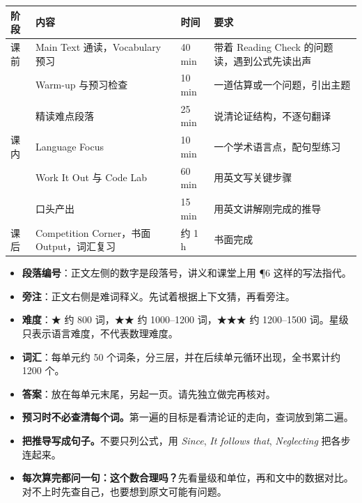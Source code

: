 \documentclass[11pt,a4paper]{article}
\begin{document}
\begin{center}
\small
\begin{tabular}{p{1.2cm}p{6.0cm}p{1.5cm}p{5.9cm}}
\toprule
\headrow 阶段 & 内容 & 时间 & 要求 \\
\midrule
课前 & Main Text 通读，Vocabulary 预习 & 40 min & 带着 Reading Check 的问题读，遇到公式先读出声 \\
\midrule
\multirow{5}{*}{课内} & Warm-up 与预习检查 & 10 min & 一道估算或一个问题，引出主题 \\
 & 精读难点段落 & 25 min & 说清论证结构，不逐句翻译 \\
 & Language Focus & 10 min & 一个学术语言点，配句型练习 \\
 & Work It Out 与 Code Lab & 60 min & 用英文写关键步骤 \\
 & 口头产出 & 15 min & 用英文讲解刚完成的推导 \\
\midrule
课后 & Competition Corner，书面 Output，词汇复习 & 约 1 h & 书面完成 \\
\bottomrule
\end{tabular}
\end{center}

\begin{itemize}
  \item \textbf{段落编号}：正文左侧的数字是段落号，讲义和课堂上用 ¶6 这样的写法指代。
  \item \textbf{旁注}：正文右侧是难词释义。先试着根据上下文猜，再看旁注。
  \item \textbf{难度}：★ 约 800 词，★★ 约 1000–1200 词，★★★ 约 1200–1500 词。星级只表示语言难度，不代表数理难度。
  \item \textbf{词汇}：每单元约 50 个词条，分三层，并在后续单元循环出现，全书累计约 1200 个。
  \item \textbf{答案}：放在每单元末尾，另起一页。请先独立做完再核对。
\end{itemize}

\begin{itemize}
  \item \textbf{预习时不必查清每个词。}第一遍的目标是看清论证的走向，查词放到第二遍。
  \item \textbf{把推导写成句子。}不要只列公式，用 \textit{Since}, \textit{It follows that}, \textit{Neglecting} 把各步连起来。
  \item \textbf{每次算完都问一句：这个数合理吗？}先看量级和单位，再和文中的数据对比。对不上时先查自己，也要想到原文可能有问题。
\end{itemize}
\end{document}
